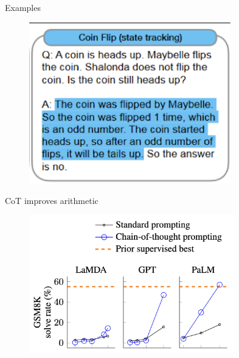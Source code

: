 \begin{vbframe}{Examples}

\vfill

\begin{figure}
    \centering
    \includegraphics[height=7cm]{figure/cotex6.png}
\end{figure}

\vfill

\end{vbframe}


\begin{vbframe}{CoT improves arithmetic}

\vfill
	
	\begin{figure}
		\centering
		\includegraphics[height = 6cm]{figure/cotperformance} 
	\end{figure}

\vfill

\end{vbframe}


